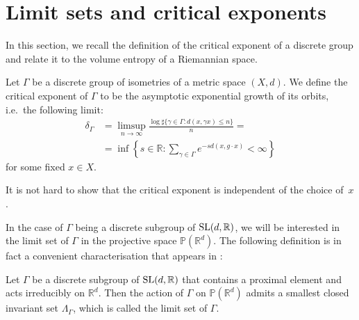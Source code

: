 \documentclass{report}
\begin{document}
\section{Limit sets and critical exponents}
In this section, we recall the definition of the critical exponent of a discrete group and relate it to the volume entropy of a Riemannian space.
\begin{definition}\label{def:group_critical_exponent}
    Let $\Gamma$ be a discrete group of isometries of a metric space $(X,d)$.
    We define the critical exponent of $\Gamma$ to be the asymptotic exponential growth of its orbits, i.e.\ the following limit:
    \begin{align*}
        \delta_\Gamma &= \limsup_{n\to \infty} \frac{\log \sharp \{ \gamma \in \Gamma : d(x, \gamma x) \leq n \}}{n} =\\
        &= \inf \left\{ 
            s \in \mathbb R : \sum_{\gamma \in \Gamma} e^{-s d(x, g \cdot x)}
        < \infty \right\}
    \end{align*}
    for some fixed $x \in X$.
\end{definition}
\begin{remark}
    It is not hard to show that the critical exponent is independent of the choice of~$x$.    
\end{remark}
In the case of $\Gamma$ being a discrete subgroup of $\operatorname{{\mathrm{SL}}}(d,\mathbb R)$, we will be interested in the limit set of $\Gamma$ in the projective space $\mathbb P(\mathbb R^d)$.
The following definition is in fact a convenient characterisation that appears in \cite{benoist1997proprietes}:
\begin{definition}\label{def:limit_set}
    Let $\Gamma$ be a discrete subgroup of $\operatorname{{\mathrm{SL}}}(d, \mathbb R)$ that contains a proximal element and acts irreducibly on $\mathbb R^d$.
    Then the action of $\Gamma$ on $\mathbb P(\mathbb R^d)$ admits a smallest closed invariant set $\Lambda_\Gamma$, which is called the limit set of $\Gamma$.
\end{definition}
\end{document}

